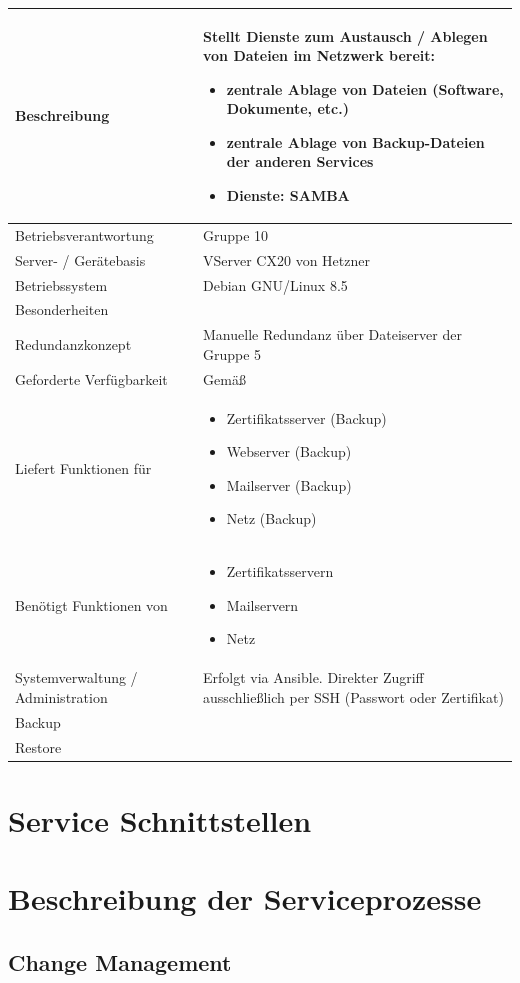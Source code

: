 \documentclass[]{article}
\begin{document}
\begin{longtable}{|l|p{6cm}|}
\toprule
Beschreibung & Stellt Dienste zum Austausch / Ablegen von Dateien im
Netzwerk bereit:

\begin{itemize}
\item
  zentrale Ablage von Dateien (Software, Dokumente, etc.)
\item
  zentrale Ablage von Backup-Dateien der anderen Services
\item
  Dienste: SAMBA
\end{itemize}\tabularnewline
\midrule
Betriebsverantwortung & Gruppe 10\tabularnewline
Server- / Gerätebasis & VServer CX20 von Hetzner\tabularnewline
Betriebssystem & Debian GNU/Linux 8.5\tabularnewline
Besonderheiten &\tabularnewline
Redundanzkonzept & Manuelle Redundanz über Dateiserver der Gruppe
5\tabularnewline
Geforderte Verfügbarkeit & Gemäß\tabularnewline
Liefert Funktionen für & \begin{itemize}
\item
  Zertifikatsserver (Backup)
\item
  Webserver (Backup)
\item
  Mailserver (Backup)
\item
  Netz (Backup)
\end{itemize}\tabularnewline
Benötigt Funktionen von & \begin{itemize}
\item
  Zertifikatsservern
\item
  Mailservern
\item
  Netz
\end{itemize}\tabularnewline
Systemverwaltung / Administration & Erfolgt via Ansible. Direkter Zugriff ausschließlich per SSH (Passwort oder Zertifikat)\tabularnewline
Backup &\tabularnewline
Restore &\tabularnewline
\bottomrule
\end{longtable}

\newpage

\section{Service Schnittstellen}\label{service-schnittstellen}

\section{Beschreibung der
Serviceprozesse}\label{beschreibung-der-serviceprozesse}

\subsection{Change Management}\label{change-management}
\end{document}
